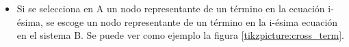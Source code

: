 \begin{itemize}
    \item Si se selecciona en A un nodo representante de un término en la ecuación i-ésima, se escoge un nodo representante de un término en la i-ésima ecuación en el sistema B. Se puede ver como ejemplo la figura \ref{tikzpicture:cross_term}.

          \begin{center}




\end{center}
\end{itemize}
